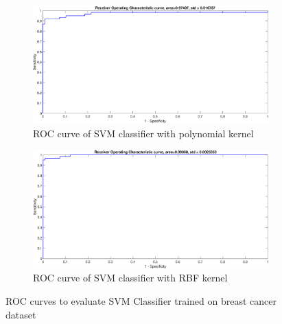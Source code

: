 {\begin{figure}[!ht]
\begin{subfigure}{.35\textwidth}
		\includegraphics[height=.65\linewidth, width=0.9\linewidth]{Exercise1/Report/breast/breast_poly_ROC.eps}
		\caption{ROC curve of SVM classifier with polynomial kernel}
		\label{fig:breast_poly_ROC}
	\end{subfigure}%
	\begin{subfigure}{.35\textwidth}
		\centering
		\captionsetup{width=0.8\linewidth}
		\includegraphics[height=.65\linewidth, width=0.9\linewidth]{Exercise1/Report/breast/breast_RBF_ROC.eps}
		\caption{ROC curve of SVM classifier with RBF kernel} 
		\label{fig:breast_RBF_ROC}
	\end{subfigure}
	\caption{ROC curves to evaluate SVM Classifier trained on breast cancer dataset}
	\label{fig:breast_ROC}
\end{figure}
\begin{table}[!htpb]
	\begin{tabular}{ |p{1.2cm}|p{1.2cm}|p{1.2cm}||p{2cm}|p{1.2cm}|p{1.2cm}||p{1.2cm}|p{1.2cm}|p{1.2cm}|}

\end{tabular}
\end{table}}
